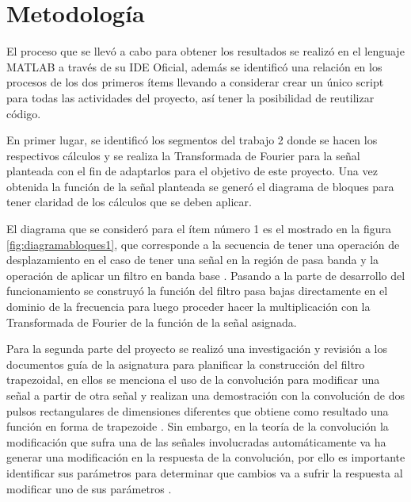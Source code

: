 \section{Metodología}\label{metodologia}
El proceso que se llevó a cabo para obtener los resultados se realizó en el lenguaje MATLAB a través de su IDE Oficial, además se identificó una relación en los procesos de los dos primeros ítems llevando a considerar crear un único script para todas las actividades del proyecto, así tener la posibilidad de reutilizar código.

En primer lugar, se identificó los segmentos del trabajo 2 donde se hacen los respectivos cálculos y se realiza la Transformada de Fourier para la señal planteada con el fin de adaptarlos para el objetivo de este proyecto. Una vez obtenida la función de la señal planteada se generó el diagrama de bloques para tener claridad de los cálculos que se deben aplicar.


\vspace{-5mm}

El diagrama que se consideró para el ítem número 1 es el mostrado en la figura \ref{fig:diagramabloques1}, que corresponde a la secuencia de tener una operación de desplazamiento en el caso de tener una señal en la región de pasa banda y la operación de aplicar un filtro en banda base \cite{filtros2021}. Pasando a la parte de desarrollo del funcionamiento se construyó la función del filtro pasa bajas directamente en el dominio de la frecuencia para luego proceder hacer la multiplicación con la Transformada de Fourier de la función de la señal asignada.

Para la segunda parte del proyecto se realizó una investigación y revisión a los documentos guía de la asignatura para planificar la construcción del filtro trapezoidal, en ellos se menciona el uso de la convolución para modificar una señal a partir de otra señal y realizan una demostración con la convolución de dos pulsos rectangulares de dimensiones diferentes que obtiene como resultado una función en forma de trapezoide \cite{ejercicio2021}. Sin embargo, en la teoría de la convolución la modificación que sufra una de las señales involucradas automáticamente va ha generar una modificación en la respuesta de la convolución, por ello es importante identificar sus parámetros para determinar que cambios va a sufrir la respuesta al modificar uno de sus parámetros \cite{Chaparro2013}.


\vspace{-5mm}

